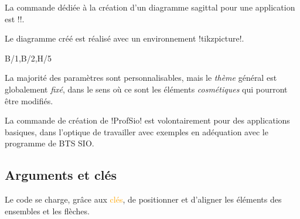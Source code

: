 \documentclass[french,a4paper,11pt]{article}
\newcommand\Cle[1]{{\small\sffamily\textlangle \textcolor{orange}{#1}\textrangle}}
\begin{document}
{{\begin{cautionblock}
La commande dédiée à la création d'un diagramme sagittal pour une application est \motcletex!\DiagrammeSagittalCompo!.

Le diagramme créé est réalisé avec un environnement \motcletex!tikzpicture!.
\end{cautionblock}

\begin{DemoCode}

\end{DemoCode}

\begin{DemoCode}[]
%
	{B/1,B/2,H/5}
\end{DemoCode}

\begin{warningblock}
La majorité des paramètres sont personnalisables, mais le \textit{thème} général est globalement \textit{fixé}, dans le sens où ce sont les éléments \textit{cosmétiques} qui pourront être modifiés.

\smallskip

La commande de création de \packagetex!ProfSio! est volontairement pour des applications basiques, dans l'optique de travailler avec exemples en adéquation avec le programme de BTS SIO.
\end{warningblock}

\subsection{Arguments et clés}

\begin{DemoCode}

\end{DemoCode}

\begin{noteblock}
Le code se charge, grâce aux \Cle{clés}, de positionner et d'aligner les éléments des ensembles et les flèches.


\end{noteblock}}}
\end{document}
